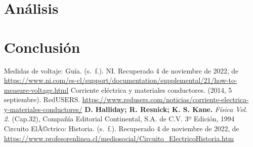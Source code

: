 \documentclass[]{article}
\begin{document}
\section{Análisis}




\section{Conclusión}


\begin{thebibliography}{5}
   Medidas de voltaje: Guía. (s. f.). NI. Recuperado 4 de noviembre de 2022, 
  de \url{https://www.ni.com/es-cl/support/documentation/supplemental/21/how-to-measure-voltage.html}
  Corriente eléctrica y materiales conductores. (2014, 5 septiembre). RedUSERS. 
  \url{https://www.redusers.com/noticias/corriente-electrica-y-materiales-conductores/}
   \textbf{D. Halliday; R. Resnick; K. S. Kane.} \textit{Física Vol. 2.} (Cap.32), Compañía Editorial Continental, S.A. de C.V. 3º Edición, 1994
   Circuito ElÃ©ctrico: Historia. (s. f.). Recuperado 4 de noviembre de 2022,
   de \url{https://www.profesorenlinea.cl/mediosocial/Circuito_ElectricoHistoria.htm}
\end{thebibliography}
\end{document}
